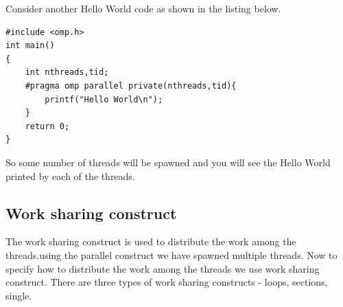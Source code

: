 \documentclass[12pt]{book}
\begin{document}
Consider another Hello World code as shown in the listing below.
\begin{lstlisting}
#include <omp.h>
int main()
{
    int nthreads,tid;
    #pragma omp parallel private(nthreads,tid){
        printf("Hello World\n");
    }
    return 0;
}
\end{lstlisting}
So some number of threads will be spawned and you will see the Hello World printed by each of the threads.

\subsection{Work sharing construct}
The work sharing construct is used to distribute the work among the threads.using the parallel construct we have spawned multiple threads.
Now to specify how to distribute the work among the threads we use work sharing construct.
There are three types of work sharing constructs - loops, sections, single.
\end{document}
